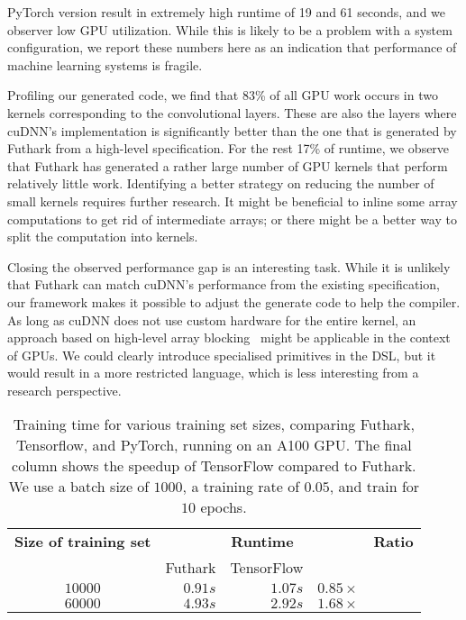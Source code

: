 PyTorch version result in extremely high runtime of 19 and 61 seconds,
and we observer low GPU utilization.  While this is likely to be a problem
with a system configuration, we report these numbers here as an indication
that performance of machine learning systems is fragile.

Profiling our generated code, we find that 83\% of all GPU work occurs
in two kernels corresponding to the convolutional layers. These are also the layers
where cuDNN's implementation is significantly better than the one
that is generated by Futhark from a high-level specification.
For the rest 17\% of runtime, we observe that Futhark has
generated a rather large number of GPU kernels that perform relatively
little work.  Identifying a better strategy on reducing the number
of small kernels requires further research.  It might be beneficial to
inline some array computations to get rid of intermediate arrays;
or there might be a better way to split the computation into kernels.

Closing the observed performance gap is an interesting task.
While it is unlikely that Futhark can match cuDNN's performance
from the existing specification, our framework makes it possible
to adjust the generate code to help the compiler.  As long as cuDNN
does not use custom hardware for the entire kernel, an approach
based on high-level array blocking~\cite{rp-mm} might be applicable
in the context of GPUs.  We could clearly introduce specialised
primitives in the DSL, but it would result in a more
restricted language, which is less interesting from a research
perspective.

\begin{table}
\begin{tabular}{crrrr}
\textbf{Size of training set} & \multicolumn{3}{c}{\textbf{Runtime}} & \textbf{Ratio} \\
& Futhark & TensorFlow & \\
$10000$ & $0.91s$ & $1.07s$ &  $0.85\times{}$ \\
$60000$ & $4.93s$ & $2.92s$ &  $1.68\times{}$
\end{tabular}
\caption{Training time for various training set sizes, comparing
  Futhark, Tensorflow, and PyTorch, running on an A100 GPU. The final column
  shows the speedup of TensorFlow compared to Futhark. We use a batch
  size of $1000$, a training rate of $0.05$, and train for $10$
  epochs.}
\label{tab:performance}
\end{table}

%
